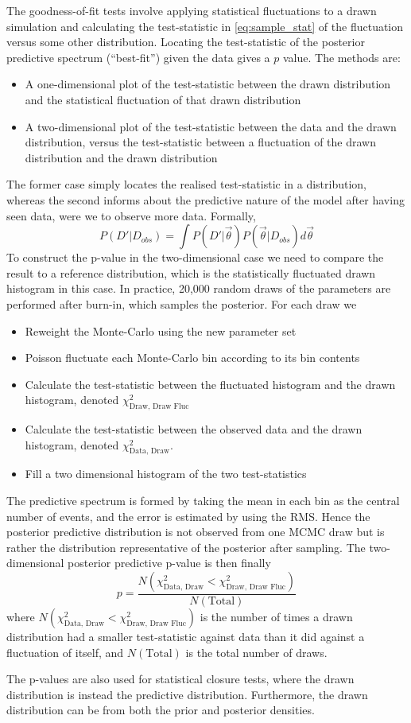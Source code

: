 The goodness-of-fit tests involve applying statistical fluctuations to a drawn simulation and calculating the test-statistic in \autoref{eq:sample_stat} of the fluctuation versus some other distribution. Locating the test-statistic of the posterior predictive spectrum (``best-fit'') given the data gives a $p$ value. The methods are:
\begin{itemize} 
	\item A one-dimensional plot of the test-statistic between the drawn distribution and the statistical fluctuation of that drawn distribution
	\item A two-dimensional plot of the test-statistic between the data and the drawn distribution, versus the test-statistic between a fluctuation of the drawn distribution and the drawn distribution
\end{itemize}
The former case simply locates the realised test-statistic in a distribution, whereas the second informs about the predictive nature of the model after having seen data, were we to observe more data. Formally,
\begin{equation}
P(D'|D_{obs}) = \int P(D'|\vec{\theta}) P(\vec{\theta}|D_{obs}) d\vec{\theta}
\end{equation}
To construct the p-value in the two-dimensional case we need to compare the result to a reference distribution, which is the statistically fluctuated drawn histogram in this case. In practice, 20,000 random draws of the parameters are performed after burn-in, which samples the posterior. For each draw we
\begin{itemize}
	\item Reweight the Monte-Carlo using the new parameter set
	\item Poisson fluctuate each Monte-Carlo bin according to its bin contents
	\item Calculate the test-statistic between the fluctuated histogram and the drawn histogram, denoted $\chi^2_{\text{Draw, Draw Fluc}}$
	\item Calculate the test-statistic between the observed data and the drawn histogram, denoted $\chi^2_{\text{Data, Draw}}$.
	\item Fill a two dimensional histogram of the two test-statistics
\end{itemize}
The predictive spectrum is formed by taking the mean in each bin as the central number of events, and the error is estimated by using the RMS. Hence the posterior predictive distribution is not observed from one MCMC draw but is rather the distribution representative of the posterior after sampling. The two-dimensional posterior predictive p-value is then finally
\begin{equation}
p = \frac{N\left(\chi^2_{\text{Data, Draw}} < \chi^2_{\text{Draw, Draw Fluc}}\right)}{N\left(\text{Total}\right)}
\end{equation}
where $N\left(\chi^2_{\text{Data, Draw}} < \chi^2_{\text{Draw, Draw Fluc}}\right)$ is the number of times a drawn distribution had a smaller test-statistic against data than it did against a fluctuation of itself, and $N(\text{Total})$ is the total number of draws.

The p-values are also used for statistical closure tests, where the drawn distribution is instead the predictive distribution. Furthermore, the drawn distribution can be from both the prior and posterior densities.